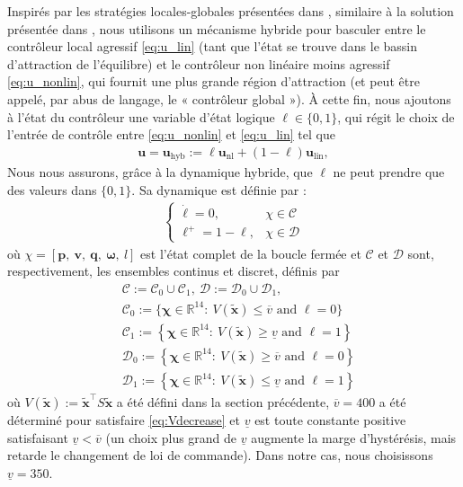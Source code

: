 Inspirés par les stratégies locales-globales présentées dans \cite[Ex. 1. 7]{65}, similaire à la solution présentée dans \cite{AndreettoFZ16}, nous utilisons un mécanisme hybride pour basculer entre le contrôleur local agressif \eqref{eq:u_lin} (tant que l'état se trouve dans le bassin d'attraction de l'équilibre) et le contrôleur non linéaire moins agressif \eqref{eq:u_nonlin}, qui fournit une plus grande région d'attraction (et peut être appelé, par abus de langage, le « contrôleur global »). À cette fin, nous ajoutons à l'état du contrôleur une variable d'état logique $\ell \in \{0,1\}$, qui régit le choix de l'entrée de contrôle entre \eqref{eq:u_nonlin} et \eqref{eq:u_lin} tel que
\begin{align}
\label{eq:u_hybrid}
  \boldsymbol{u}=\boldsymbol{u}_{\text{hyb}} := \ell \boldsymbol{u}_{\text{nl}} + (1-\ell) \boldsymbol{u}_{\text{lin}},
\end{align}
Nous nous assurons, grâce à la dynamique hybride, que $\ell$ ne peut prendre que des valeurs dans $\{0,1\}$. Sa dynamique est définie par : 
\begin{align*}
    \left\{
        \begin{array}{ll}
            \dot \ell = 0,& \chi \in \mathcal{C}\\
            \ell^{+} = 1-\ell,& \chi \in \mathcal{D}
        \end{array}
    \right.
\end{align*}
où $\chi = \left[\boldsymbol{p},~ \boldsymbol{v},~ \boldsymbol{q},~  \boldsymbol{\omega},~ l\right]$ est l'état complet de la boucle fermée et $\mathcal{C}$ et $\mathcal{D}$ sont, respectivement, les ensembles continus et discret, définis par
\begin{align*}
    & \mathcal{C} := \mathcal{C}_{0} \cup \mathcal{C}_{1}, ~ \mathcal{D} := \mathcal{D}_{0} \cup \mathcal{D}_{1},\\
   & \mathcal{C}_{0} :=\{\boldsymbol{\chi} \in \mathbb{R}^{14}:~ V(\boldsymbol{\tilde x}) \le \overline{v} \mbox{ and } \ell=0\}\\
   & \mathcal{C}_{1} :=\left\{\boldsymbol{\chi} \in \mathbb{R}^{14}:~ V(\boldsymbol{\tilde x}) \ge \underline{v} \mbox{ and } \ell=1 \right\}\\
   & \mathcal{D}_{0} :=\left\{\boldsymbol{\chi} \in \mathbb{R}^{14}:~ V(\boldsymbol{\tilde x}) \geq \overline{v}\mbox{ and } \ell=0 \right\}\\
   & \mathcal{D}_{1} :=\left\{\boldsymbol{\chi} \in \mathbb{R}^{14}:~ V(\boldsymbol{\tilde x}) \leq \underline{v}\mbox{ and } \ell=1 \right\}
\end{align*}
où $V(\boldsymbol{\tilde x}) := \boldsymbol{\tilde x}^\top S \boldsymbol{\tilde x}$  a été défini dans la section précédente, $\overline{v}=400$ a été déterminé pour satisfaire \eqref{eq:Vdecrease} et $\underline{v}$ est toute constante positive satisfaisant $\underline{v}<\overline{v}$ (un choix plus grand de $\underline{v}$ augmente la marge d'hystérésis, mais retarde le changement de loi de commande). Dans notre cas, nous choisissons $\underline{v}= 350$.

